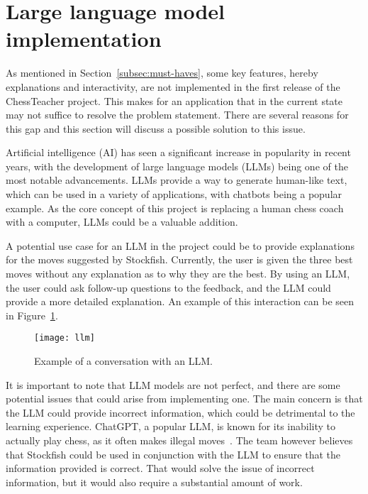 \section{Large language model implementation}\label{sec:large-language-model-implementation}

As mentioned in Section~\ref{subsec:must-haves}, some key features, hereby explanations and interactivity, are not
implemented in the first release of the ChessTeacher project.
This makes for an application that in the current state may not suffice to resolve the problem statement.
There are several reasons for this gap and this section will discuss a possible solution to this issue.

Artificial intelligence (AI) has seen a significant increase in popularity in recent years, with the development of
large language models (LLMs) being one of the most notable advancements.
LLMs provide a way to generate human-like text, which can be used in a variety of applications, with chatbots being a
popular example.
As the core concept of this project is replacing a human chess coach with a computer, LLMs could be a valuable addition.

A potential use case for an LLM in the project could be to provide explanations for the moves suggested by Stockfish.
Currently, the user is given the three best moves without any explanation as to why they are the best.
By using an LLM, the user could ask follow-up questions to the feedback, and the LLM could provide a more detailed
explanation.
An example of this interaction can be seen in Figure~\ref{fig:llm}.

\begin{figure}[H]
    \centering
    \texttt{[image: llm]}
    \caption{Example of a conversation with an LLM.}\label{fig:llm}
\end{figure}

It is important to note that LLM models are not perfect, and there are some potential issues that could arise from
implementing one.
The main concern is that the LLM could provide incorrect information, which could be detrimental to the learning
experience.
ChatGPT, a popular LLM, is known for its inability to actually play chess, as it often makes illegal
moves~\cite{llm-chess}.
The team however believes that Stockfish could be used in conjunction with the LLM to ensure that the information
provided is correct.
That would solve the issue of incorrect information, but it would also require a substantial amount of work.

